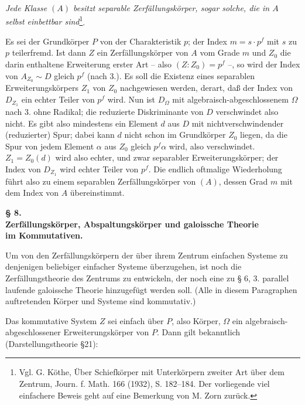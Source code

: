 \medskip
\noindent\textbf{}\quad \emph{Jede Klasse \((A)\) besitzt separable Zerfällungskörper, sogar solche, die in \(A\) selbst einbettbar sind}\footnote{Vgl. G. Köthe, Über Schiefkörper mit Unterkörpern zweiter Art über dem Zentrum, Journ. f. Math. 166 (1932), S. 182--184. Der vorliegende viel einfachere Beweis geht auf eine Bemerkung von M. Zorn zurück.}.

Es sei der Grundkörper \(P\) von der Charakteristik \(p\); der Index \(m=s\cdot p^f\) mit \(s\) zu \(p\) teilerfremd. Ist dann \(Z\) ein Zerfällungskörper von \(A\) vom Grade \(m\) und \(Z_0\) die darin enthaltene Erweiterung erster Art -- also \((Z:Z_0)=p^f\) --, so wird der Index von \(A_{Z_0}\sim D\) gleich \(p^f\) (nach 3.). Es soll die Existenz eines separablen Erweiterungskörpers \(Z_1\) von \(Z_0\) nachgewiesen werden, derart, daß der Index von \(D_{Z_1}\) ein echter Teiler von \(p^f\) wird. Nun ist \(D_\Omega\) mit algebraisch-abgeschlossenem \(\Omega\) nach 3. ohne Radikal; die reduzierte Diskriminante von \(D\) verschwindet also nicht. Es gibt also mindestens ein Element \(d\) aus \(D\) mit nichtverschwindender (reduzierter) Spur; dabei kann \(d\) nicht schon im Grundkörper \(Z_0\) liegen, da die Spur von jedem Element \(\alpha\) aus \(Z_0\) gleich \(p^f\alpha\) wird, also verschwindet. \(Z_1=Z_0(d)\) wird also echter, und zwar separabler Erweiterungskörper; der Index von \(D_{Z_1}\) wird echter Teiler von \(p^f\). Die endlich oftmalige Wiederholung führt also zu einem separablen Zerfällungskörper von \((A)\), dessen Grad \(m\) mit dem Index von \(A\) übereinstimmt.

\begin{center}
\textbf{§ 8.}\\[0.35em]
\textbf{Zerfällungskörper, Abspaltungskörper und galoissche Theorie\\
im Kommutativen.}
\end{center}

Um von den Zerfällungskörpern der über ihrem Zentrum einfachen Systeme zu denjenigen beliebiger einfacher Systeme überzugehen, ist noch die Zerfällungstheorie des Zentrums zu entwickeln, der noch eine zu § 6, 3. parallel laufende galoissche Theorie hinzugefügt werden soll. (Alle in diesem Paragraphen auftretenden Körper und Systeme sind kommutativ.)

\noindent\textbf{}\quad Das kommutative System \(Z\) sei einfach über \(P\), also Körper, \(\Omega\) ein algebraisch-abgeschlossener Erweiterungskörper von \(P\). Dann gilt bekanntlich (Darstellungstheorie §21):

